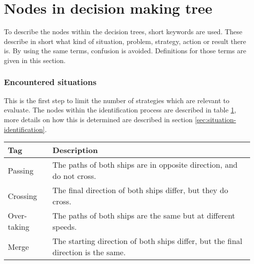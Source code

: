 \section{Nodes in decision making tree}
To describe the nodes within the decision trees, short keywords are used. These describe in short what kind of situation, problem, strategy, action or result there is. By using the same terms, confusion is avoided. Definitions for those terms are given in this section.

\subsubsection{Encountered situations}
This is the first step to limit the number of strategies which are relevant to evaluate. The nodes within the identification process are described in table \ref{tab:situations}, more details on how this is determined are described in section \ref{sec:situation-identification}.
\begin{table}[H]
	\begin{tabular}{p{}|p{}}
		\toprule
		Tag & Description\\
		\midrule
		Passing & The paths of both ships are in opposite direction, and do not cross. \\
		Crossing & The final direction of both ships differ, but they do cross. \\
		Over-taking & The paths of both ships are the same but at different speeds. \\
		Merge & The starting direction of both ships differ, but the final direction is the same. \\
		\bottomrule
	\end{tabular}
	
	\label{tab:situations}
\end{table}

